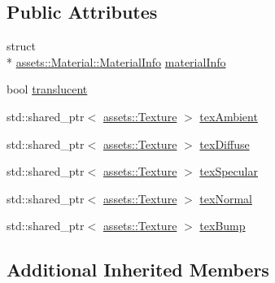 \subsection*{Public Attributes}
\begin{DoxyCompactItemize}
\item 
struct \\*
\hyperlink{structassets_1_1Material_1_1MaterialInfo}{assets\-::\-Material\-::\-Material\-Info} \hyperlink{classassets_1_1Material_aadf4a85a9c84a212bf70a66863c9ce25}{material\-Info}
\item 
bool \hyperlink{classassets_1_1Material_a0319520a8574e4425d3f33545f3fe8cd}{translucent}
\item 
std\-::shared\-\_\-ptr$<$ \hyperlink{classassets_1_1Texture}{assets\-::\-Texture} $>$ \hyperlink{classassets_1_1Material_a3519d812c3b52faa51e8ee105581a080}{tex\-Ambient}
\item 
std\-::shared\-\_\-ptr$<$ \hyperlink{classassets_1_1Texture}{assets\-::\-Texture} $>$ \hyperlink{classassets_1_1Material_ab415308f35aa92ba6cfeaf384a3e03eb}{tex\-Diffuse}
\item 
std\-::shared\-\_\-ptr$<$ \hyperlink{classassets_1_1Texture}{assets\-::\-Texture} $>$ \hyperlink{classassets_1_1Material_ab0357e94a23e480b11ba859a122d5395}{tex\-Specular}
\item 
std\-::shared\-\_\-ptr$<$ \hyperlink{classassets_1_1Texture}{assets\-::\-Texture} $>$ \hyperlink{classassets_1_1Material_a0e17989592b905f9d12d1353ec34f9e2}{tex\-Normal}
\item 
std\-::shared\-\_\-ptr$<$ \hyperlink{classassets_1_1Texture}{assets\-::\-Texture} $>$ \hyperlink{classassets_1_1Material_ad8681142b15d5a60a519f7ca903d415b}{tex\-Bump}
\end{DoxyCompactItemize}
\subsection*{Additional Inherited Members}


